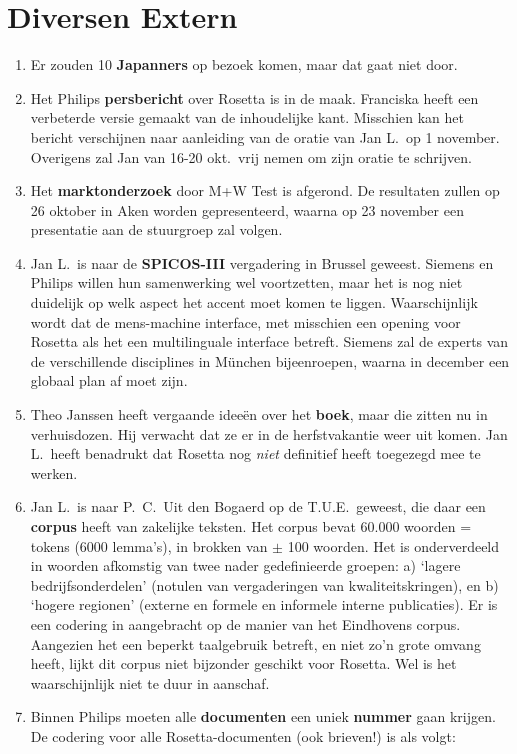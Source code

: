 \section{Diversen Extern}
\begin{enumerate}
  \item Er zouden 10 {\bf Japanners} op bezoek komen, maar dat gaat niet door.
  \item Het Philips {\bf persbericht} over Rosetta is in de maak. Franciska heeft 
een verbeterde versie gemaakt van de inhoudelijke kant. Misschien kan het 
bericht verschijnen naar aanleiding van de oratie van Jan L.\ op 1 november.
Overigens zal Jan van 16-20 okt.\ vrij nemen om zijn oratie te schrijven.
  \item Het {\bf marktonderzoek} door M+W Test is afgerond. De resultaten zullen op 
26 oktober in Aken worden gepresenteerd, waarna op 23 november een presentatie 
aan de stuurgroep zal volgen.
  \item Jan L.\ is naar de {\bf SPICOS-III} vergadering in Brussel geweest. 
Siemens en Philips willen hun samenwerking wel voortzetten, maar het is nog niet 
duidelijk op welk aspect het accent moet komen te liggen. Waarschijnlijk wordt 
dat de mens-machine interface, met misschien een opening voor Rosetta als het 
een multilinguale interface betreft. Siemens zal de experts van de 
verschillende disciplines in M\"{u}nchen bijeenroepen, waarna in december een 
globaal plan af moet zijn.
  \item Theo Janssen heeft vergaande idee\"{e}n over het {\bf boek}, maar die 
zitten nu in verhuisdozen. Hij verwacht dat ze er in de herfstvakantie weer uit 
komen. Jan L.\ heeft benadrukt dat Rosetta nog {\em niet\/} definitief heeft 
toegezegd mee te werken.
  \item Jan L.\ is naar P.\ C.\ Uit den Bogaerd op de T.U.E.\ geweest, die daar 
een {\bf corpus} heeft van zakelijke teksten. Het corpus bevat 60.000 
woorden = tokens (6000 lemma's), in brokken van $\pm$ 100 woorden.  Het is 
onderverdeeld in
woorden afkomstig van twee nader gedefinieerde groepen: a) `lagere 
bedrijfsonderdelen' (notulen van vergaderingen van kwaliteitskringen), en b) 
`hogere regionen' (externe en formele en informele interne publicaties). Er is 
een codering in aangebracht op de manier van het Eindhovens corpus. Aangezien 
het een beperkt taalgebruik betreft, en niet zo'n grote omvang heeft, lijkt dit 
corpus niet bijzonder geschikt voor Rosetta. Wel is het waarschijnlijk niet te 
duur in aanschaf.
  \item Binnen Philips moeten alle {\bf documenten} een uniek {\bf nummer} gaan 
krijgen. De codering voor alle Rosetta-documenten (ook brieven!) is als volgt:


\end{enumerate}
